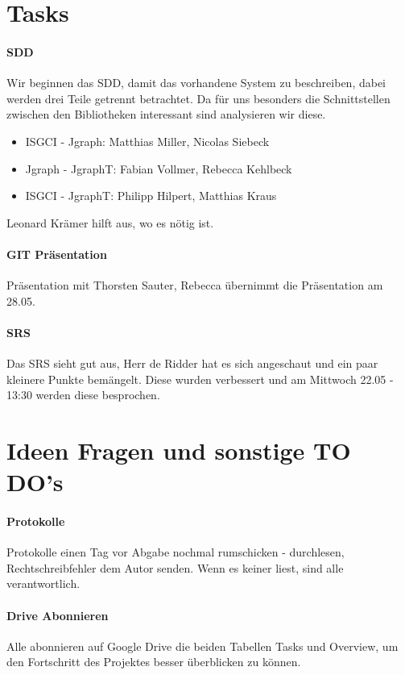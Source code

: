 \documentclass{scrartcl}
\begin{document}
\section{Tasks}
\paragraph{SDD} Wir beginnen das SDD, damit das vorhandene System zu beschreiben, dabei werden drei Teile getrennt betrachtet. Da für uns besonders die Schnittstellen zwischen den Bibliotheken interessant sind analysieren wir diese. \begin{itemize}
\item ISGCI - Jgraph: Matthias Miller, Nicolas Siebeck
\item Jgraph - JgraphT: Fabian Vollmer, Rebecca Kehlbeck
\item ISGCI - JgraphT: Philipp Hilpert, Matthias Kraus
\end{itemize}
Leonard Krämer hilft aus, wo es nötig ist.

\paragraph{GIT Präsentation} Präsentation mit Thorsten Sauter, Rebecca übernimmt die Präsentation am 28.05.
\paragraph{SRS} Das SRS sieht gut aus, Herr de Ridder hat es sich angeschaut und ein paar kleinere Punkte bemängelt. Diese wurden verbessert und am Mittwoch 22.05 - 13:30 werden diese besprochen.
\section{Ideen Fragen und sonstige TO DO's}
\paragraph{Protokolle}Protokolle einen Tag vor Abgabe nochmal rumschicken - durchlesen, Rechtschreibfehler dem Autor senden. Wenn es keiner liest, sind alle verantwortlich.
\paragraph{Drive Abonnieren}Alle abonnieren auf Google Drive die beiden Tabellen Tasks und Overview, um den Fortschritt des Projektes besser überblicken zu können.
\end{document}
